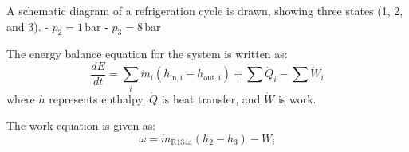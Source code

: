 A schematic diagram of a refrigeration cycle is drawn, showing three states (1, 2, and 3).  
- \( p_2 = 1 \, \text{bar} \)  
- \( p_3 = 8 \, \text{bar} \)  

The energy balance equation for the system is written as:  
\[
\frac{dE}{dt} = \sum_i \dot{m}_i \left( h_{\text{in},i} - h_{\text{out},i} \right) + \sum \dot{Q}_i - \sum \dot{W}_i
\]  
where \( h \) represents enthalpy, \( \dot{Q} \) is heat transfer, and \( \dot{W} \) is work.  

The work equation is given as:  
\[
\omega = \dot{m}_{\text{R134a}} \left( h_2 - h_3 \right) - W_i
\]